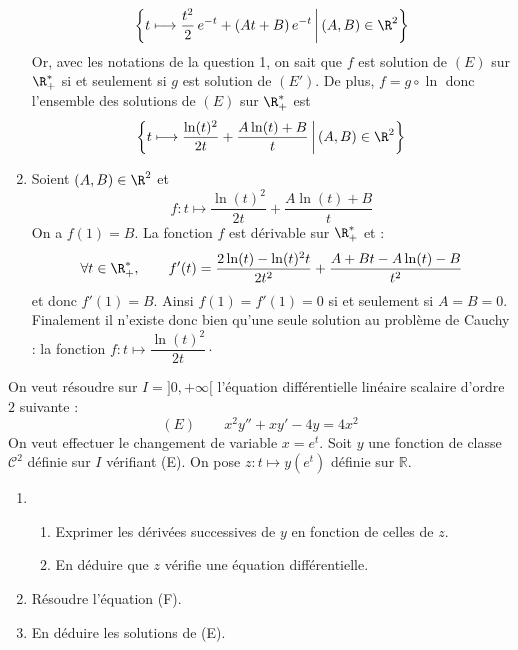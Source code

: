 \documentclass[a4paper,10pt]{report}
\begin{document}
\begin{enumerate}
$$
\bigg\{t \longmapsto \dfrac{t^2}{2}\,e^{-t}+(At+B)\,e^{-t}\,\bigg|\,(A,B)\in \R^2\bigg\}
$$
Or, avec les notations de la question 1, on sait que $f$ est solution de $(E)$ sur $\R_+^*$ si et seulement si $g$ est solution de $(E')$. De plus, $f=g\circ \ln$ donc l'ensemble des solutions de $(E)$ sur $\R_+^*$ est 
$$\bigg\{t \longmapsto \frac{\ln(t)^2}{2t}+\frac{A\ln(t)+B}{t}\,\bigg|\,(A,B)\in \R^2\bigg\}$$
\item Soient $(A,B)\in \R^2$ et 
$$f : t \longmapsto \dfrac{\ln(t)^2}{2t}+\dfrac{A\ln(t)+B}{t}$$
 On a $f(1)=B$. La fonction $f$ est dérivable sur $\R_+^*$ et :
$$
\forall t\in \R_+^*,\qquad f'(t)=\frac{2\ln(t)-\ln(t)^2t}{2t^2}+\frac{A+Bt-A\ln(t)-B}{t^2}
$$
et donc $f'(1)=B$. Ainsi $f(1)=f'(1)=0$ si et seulement si $A=B=0$. Finalement il n'existe donc bien qu'une seule solution au problème de Cauchy : la fonction $f : t \longmapsto \dfrac{\ln(t)^2}{2t} \cdot$
\end{enumerate}

\begin{Exercice}{} On veut résoudre sur $I=]0,+\infty[$ l'équation  différentielle linéaire scalaire d'ordre $2$ suivante :
$$ (E) \qquad x^2y''+xy' -4y = 4x^2$$
On veut effectuer le changement de variable $x=e^t$. Soit $y$ une fonction de classe $\mathcal C^2$ définie sur $I$ vérifiant (E). On pose $z : t \mapsto y(e^t)$ définie sur $\mathbb R$. 

\begin{enumerate}
\item
\begin{enumerate}
\item Exprimer les dérivées successives de $y$ en fonction de celles de $z$.
\item En déduire que $z$ vérifie une équation différentielle.
\end{enumerate}
\item Résoudre l'équation (F).
\item En déduire les solutions de (E).
\end{enumerate}
\end{Exercice}

\corr
\end{document}
